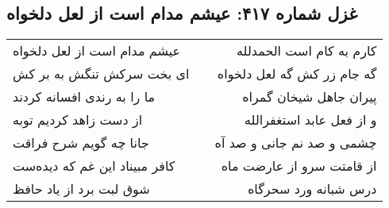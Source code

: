 \begin{center}
\section*{غزل شماره ۴۱۷: عیشم مدام است از لعل دلخواه}
\label{sec:sh417}
\begin{longtable}{l p{0.5cm} r}
عیشم مدام است از لعل دلخواه
&&
کارم به کام است الحمدلله
\\
ای بخت سرکش تنگش به بر کش
&&
گه جام زر کش گه لعل دلخواه
\\
ما را به رندی افسانه کردند
&&
پیران جاهل شیخان گمراه
\\
از دست زاهد کردیم توبه
&&
و از فعل عابد استغفرالله
\\
جانا چه گویم شرح فراقت
&&
چشمی و صد نم جانی و صد آه
\\
کافر مبیناد این غم که دیده‌ست
&&
از قامتت سرو از عارضت ماه
\\
شوق لبت برد از یاد حافظ
&&
درس شبانه ورد سحرگاه
\\
\end{longtable}
\end{center}
